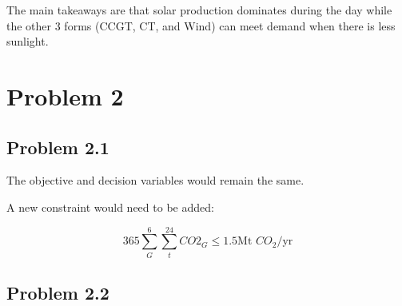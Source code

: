 \documentclass[12pt,a4paper]{article}
\begin{document}
The main takeaways are that solar production dominates during the day while the other 3 forms (CCGT, CT, and Wind) can meet demand when there is less sunlight.

\section{Problem 2}
\subsection{Problem 2.1}
The objective and decision variables would remain the same.

A new constraint would need to be added:

\[
365 \sum_{G}^6 \sum_{t}^{24} CO2_{G} \le 1.5 \text{Mt $CO_2$/yr}
\]
\subsection{Problem 2.2}
\end{document}

